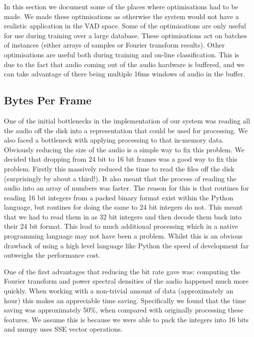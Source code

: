 \documentclass[ %
                    author={Sam Phippen},
                supervisor={Dr. Rafal Bogacz},
                     title={Real time voice activity detectors in noisy personal computing environments},
                  subtitle={},
                    degree={MEng},
                      year={2012} ]{thesis}
\begin{document}
In this section we document some of the places where optimisations had to be
made. We made these optimisations as otherwise the system would not have a
realistic application in the VAD space. Some of the optimisations are only
useful for use during training over a large database. These optimisations act
on batches of instances (either arrays of samples or Fourier transform
results). Other optimisations are useful both during training and on-line
classification. This is due to the fact that audio coming out of the audio
hardware is buffered, and we can take advantage of there being multiple 16ms
windows of audio in the buffer.

\subsection{Bytes Per Frame}

One of the initial bottlenecks in the implementation of our system was reading
all the audio off the disk into a representation that could be used for
processing. We also faced a bottleneck with applying processing to that
in-memory data. Obviously reducing the size of the audio is a simple way to fix
this problem. We decided that dropping from 24 bit to 16 bit frames was a good
way to fix this problem. Firstly this massively reduced the time to read the
files off the disk (surprisingly by about a third!). It also meant that the
process of reading the audio into an array of numbers was faster. The reason
for this is that routines for reading 16 bit integers from a packed binary
format exist within the Python language, but routines for doing the same to 24
bit integers do not. This meant that we had to read them in as 32 bit integers
and then decode them back into their 24 bit format. This lead to much
additional processing which in a native programming language may not have been
a problem. Whilst this is an obvious drawback of using a high level language
like Python the speed of development far outweighs the performance cost.

One of the first advantages that reducing the bit rate gave was: computing the
Fourier transform and power spectral densities of the audio happened much more
quickly. When working with a non-trivial amount of data (approximately an hour)
this makes an appreciable time saving. Specifically we found that the time
saving was approximately 50\%, when compared with originally processing these
features. We assume this is because we were able to pack the integers into 16
bits and numpy uses SSE vector operations.
\end{document}
